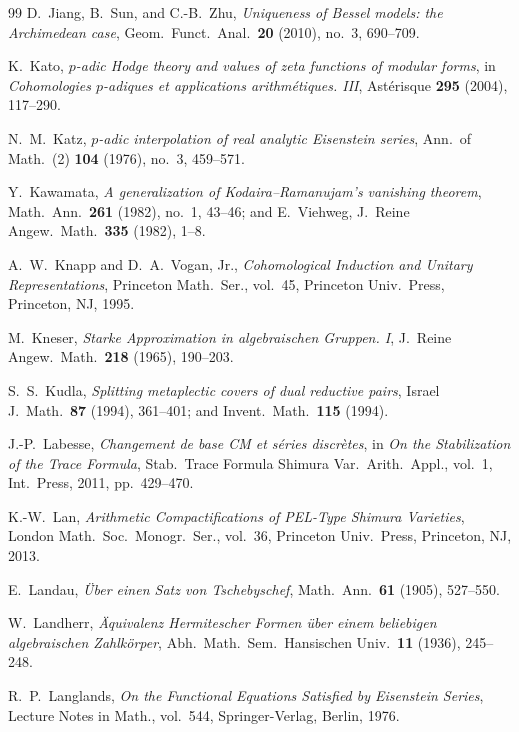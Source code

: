 \begin{thebibliography}{99}
D.~Jiang, B.~Sun, and C.-B.~Zhu,
\emph{Uniqueness of Bessel models: the Archimedean case},
Geom.\ Funct.\ Anal.\ \textbf{20} (2010), no.~3, 690--709.

K.~Kato,
\emph{$p$-adic Hodge theory and values of zeta functions of modular forms},
in \emph{Cohomologies $p$-adiques et applications arithm\'etiques. III}, Ast\'erisque \textbf{295} (2004), 117--290.

N.~M.~Katz,
\emph{$p$-adic interpolation of real analytic Eisenstein series},
Ann.\ of Math.\ (2) \textbf{104} (1976), no.~3, 459--571.

Y.~Kawamata,
\emph{A generalization of Kodaira--Ramanujam's vanishing theorem},
Math.\ Ann.\ \textbf{261} (1982), no.~1, 43--46; and E.~Viehweg, J.\ Reine Angew.\ Math.\ \textbf{335} (1982), 1--8.

A.~W.~Knapp and D.~A.~Vogan, Jr.,
\emph{Cohomological Induction and Unitary Representations},
Princeton Math.\ Ser., vol.~45, Princeton Univ.\ Press, Princeton, NJ, 1995.

M.~Kneser,
\emph{Starke Approximation in algebraischen Gruppen. I},
J.\ Reine Angew.\ Math.\ \textbf{218} (1965), 190--203.

S.~S.~Kudla,
\emph{Splitting metaplectic covers of dual reductive pairs},
Israel J.\ Math.\ \textbf{87} (1994), 361--401; and Invent.\ Math.\ \textbf{115} (1994).

J.-P.~Labesse,
\emph{Changement de base CM et s\'eries discr\`etes},
in \emph{On the Stabilization of the Trace Formula}, Stab.\ Trace Formula Shimura Var.\ Arith.\ Appl., vol.~1, Int.\ Press, 2011, pp.~429--470.

K.-W.~Lan,
\emph{Arithmetic Compactifications of PEL-Type Shimura Varieties},
London Math.\ Soc.\ Monogr.\ Ser., vol.~36, Princeton Univ.\ Press, Princeton, NJ, 2013.

E.~Landau,
\emph{\"Uber einen Satz von Tschebyschef},
Math.\ Ann.\ \textbf{61} (1905), 527--550.

W.~Landherr,
\emph{\"Aquivalenz Hermitescher Formen \"uber einem beliebigen algebraischen Zahlk\"orper},
Abh.\ Math.\ Sem.\ Hansischen Univ.\ \textbf{11} (1936), 245--248.

R.~P.~Langlands,
\emph{On the Functional Equations Satisfied by Eisenstein Series},
Lecture Notes in Math., vol.~544, Springer-Verlag, Berlin, 1976.


\end{thebibliography}
